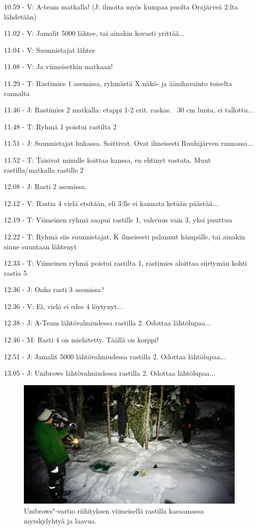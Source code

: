 \begin{multicols}{2}
\setlength{\parindent}{0em} 10.59 - V: A-team matkalla! (J: ilmoita myös 
kumpaa puolta Orajärveä 2:lta lähdetään)

11.02 - V: Jamalit 5000 lähtee, tai ainakin kovasti yrittää...

11.04 - V: Suunnistajat lähtee

11.08 - V: Ja viimeisetkin matkaan!

11.29 - T: Rastimies 1 asemissa, ryhmästä X näkö- ja äänihavainto 
toiselta rannalta

11.46 - J: Rastimies 2 matkalla: etappi 1-2 erit. raskas. ~30 cm lunta, ei 
tallottu...

11.48 - T: Ryhmä 1 poistui rastilta 2

11.51 - J: Suunnistajat hukassa. Soittivat. Ovat ilmeisesti Ruuhijärven 
rannassa...

11.52 - T: Taisivat minulle koittaa kanssa, en ehtinyt vastata. Muut 
rastilla/matkalla rastille 2

12.08 - J: Rasti 2 asemissa.

12.12 - V: Rastia 4 vielä etsitään, eli 3:lle ei kannata ketään 
päästää...

12.19 - T: Viimeinen ryhmä saapui rastille 1, vahvuus vain 3, yksi puuttuu

12.22 - T: Ryhmä siis suunnistajat, K ilmeisesti palannut kämpälle, tai 
ainakin sinne suuntaan lähtenyt

12.33 - T: Viimeinen ryhmä poistui rastilta 1, rastimies aloittaa siirtymän 
kohti rastia 5

12.36 - J: Onko rasti 3 asemissa?

12.36 - V: Ei, vielä ei edes 4 löytynyt...

12.38 - J: A-Team lähtövalmiudessa rastilla 2. Odottaa lähtölupaa...

12.46 - M: Rasti 4 on miehitetty. Täällä on korppi!

12.51 - J: Jamalit 5000 lähtövalmiudessa rastilla 2. Odottaa lähtölupaa...

13.05 - J: Unibrows lähtövalmiudessa rastilla 2. Odottaa lähtölupaa...

\begin{figure}[!t]
\centering\small\includegraphics[width=\textwidth]{assets/riihitys2018}
Unibrows"-vartio riihityksen viimeisellä rastilla kasaamassa myrskylyhtyä ja 
laavua.
\end{figure}


\end{multicols}
